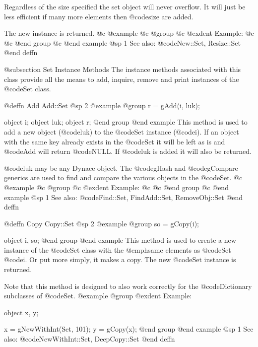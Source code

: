 Regardless of the size specified the set object will never overflow.
It will just be less efficient if many more elements then @code{size}
are added.

The new instance is returned.
@c @example
@c @group
@c @exdent Example:
@c 
@c @end group
@c @end example
@sp 1
See also:  @code{New::Set, Resize::Set}
@end deffn





@subsection Set Instance Methods
The instance methods associated with this class provide all the means
to add, inquire, remove and print instances of the @code{Set} class.












@deffn {Add} Add::Set
@sp 2
@example
@group
r = gAdd(i, luk);

object  i;
object  luk;
object  r;
@end group
@end example
This method is used to add a new object (@code{luk}) to the @code{Set} instance
(@code{i}).  If an object with the same key already exists in the @code{Set} it
will be left as is and @code{Add} will return @code{NULL}.  If
@code{luk} is added it will also be returned.

@code{luk} may be any Dynace object.  The @code{gHash} and
@code{gCompare} generics are used to find and compare the various
objects in the @code{Set}.
@c @example
@c @group
@c @exdent Example:
@c 
@c @end group
@c @end example
@sp 1
See also:  @code{Find::Set, FindAdd::Set, RemoveObj::Set}
@end deffn











@deffn {Copy} Copy::Set
@sp 2
@example
@group
so = gCopy(i);

object  i, so;
@end group
@end example
This method is used to create a new instance of the @code{Set} class
with the @emph{same} elements as @code{Set} @code{i}.  Or put more simply,
it makes a copy.  The new @code{Set} instance is returned.

Note that this method is designed to also work correctly for the
@code{Dictionary} subclasses of @code{Set}.
@example
@group
@exdent Example:

object  x, y;

x = gNewWithInt(Set, 101);
y = gCopy(x);
@end group
@end example
@sp 1
See also:  @code{NewWithInt::Set, DeepCopy::Set}
@end deffn













